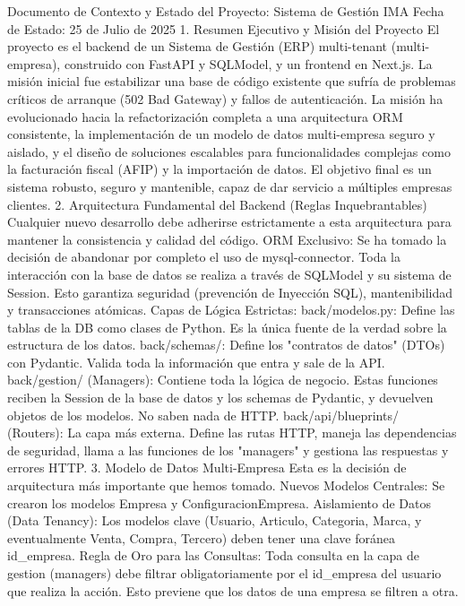 Documento de Contexto y Estado del Proyecto: Sistema de Gestión IMA
Fecha de Estado: 25 de Julio de 2025
1. Resumen Ejecutivo y Misión del Proyecto
El proyecto es el backend de un Sistema de Gestión (ERP) multi-tenant (multi-empresa), construido con FastAPI y SQLModel, y un frontend en Next.js. La misión inicial fue estabilizar una base de código existente que sufría de problemas críticos de arranque (502 Bad Gateway) y fallos de autenticación. La misión ha evolucionado hacia la refactorización completa a una arquitectura ORM consistente, la implementación de un modelo de datos multi-empresa seguro y aislado, y el diseño de soluciones escalables para funcionalidades complejas como la facturación fiscal (AFIP) y la importación de datos. El objetivo final es un sistema robusto, seguro y mantenible, capaz de dar servicio a múltiples empresas clientes.
2. Arquitectura Fundamental del Backend (Reglas Inquebrantables)
Cualquier nuevo desarrollo debe adherirse estrictamente a esta arquitectura para mantener la consistencia y calidad del código.
ORM Exclusivo: Se ha tomado la decisión de abandonar por completo el uso de mysql-connector. Toda la interacción con la base de datos se realiza a través de SQLModel y su sistema de Session. Esto garantiza seguridad (prevención de Inyección SQL), mantenibilidad y transacciones atómicas.
Capas de Lógica Estrictas:
back/modelos.py: Define las tablas de la DB como clases de Python. Es la única fuente de la verdad sobre la estructura de los datos.
back/schemas/: Define los "contratos de datos" (DTOs) con Pydantic. Valida toda la información que entra y sale de la API.
back/gestion/ (Managers): Contiene toda la lógica de negocio. Estas funciones reciben la Session de la base de datos y los schemas de Pydantic, y devuelven objetos de los modelos. No saben nada de HTTP.
back/api/blueprints/ (Routers): La capa más externa. Define las rutas HTTP, maneja las dependencias de seguridad, llama a las funciones de los "managers" y gestiona las respuestas y errores HTTP.
3. Modelo de Datos Multi-Empresa
Esta es la decisión de arquitectura más importante que hemos tomado.
Nuevos Modelos Centrales: Se crearon los modelos Empresa y ConfiguracionEmpresa.
Aislamiento de Datos (Data Tenancy): Los modelos clave (Usuario, Articulo, Categoria, Marca, y eventualmente Venta, Compra, Tercero) deben tener una clave foránea id_empresa.
Regla de Oro para las Consultas: Toda consulta en la capa de gestion (managers) debe filtrar obligatoriamente por el id_empresa del usuario que realiza la acción. Esto previene que los datos de una empresa se filtren a otra.
